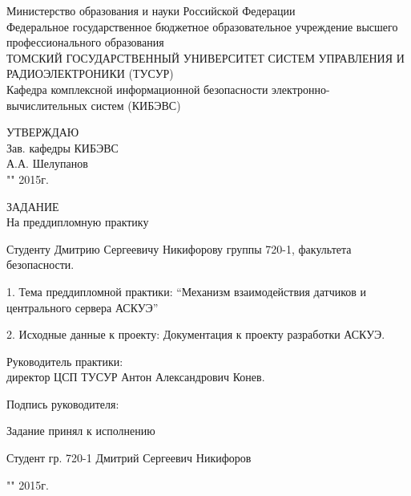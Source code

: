 \newpage
{}

\begin{center}
Министерство образования и науки Российской Федерации\\
Федеральное государственное бюджетное образовательное учреждение высшего профессионального образования\\
ТОМСКИЙ ГОСУДАРСТВЕННЫЙ УНИВЕРСИТЕТ СИСТЕМ УПРАВЛЕНИЯ И РАДИОЭЛЕКТРОНИКИ (ТУСУР)\\
Кафедра комплексной информационной безопасности электронно-вычислительных систем (КИБЭВС)\\
\end{center}

\begin{flushright}
 \begin{minipage}{0.4\textwidth}
  УТВЕРЖДАЮ \\
  Зав. кафедры КИБЭВС \\
  \underline{\hspace{2.5cm}}А.А. Шелупанов \\
  "\underline{\hspace{1cm}}"\underline{\hspace{3cm}} 2015г.
 \end{minipage}
\end{flushright}

\vspace{2cm}

\begin{center}
 ЗАДАНИЕ \\
 На преддипломную практику
\end{center}

Студенту Дмитрию Сергеевичу Никифорову группы 720-1, факультета безопасности.

1. Тема преддипломной практики: ``Механизм взаимодействия датчиков и центрального сервера АСКУЭ''

2. Исходные данные к проекту: Документация к проекту разработки АСКУЭ.

Руководитель практики: \\ директор ЦСП ТУСУР Антон Александрович Конев.

\hfill Подпись руководителя: \underline{\hspace{2.5cm}}

Задание принял к исполнению

Студент гр. 720-1 Дмитрий Сергеевич Никифоров \hfill \underline{\hspace{2.5cm}}

\hfill "\underline{\hspace{1cm}}"\underline{\hspace{3cm}} 2015г.